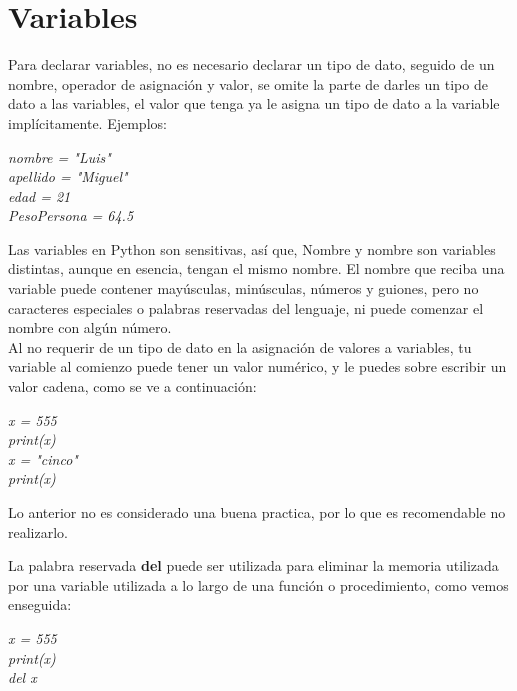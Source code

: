 \section{Variables}
\hspace{0.55cm}Para declarar variables, no es necesario declarar un tipo de dato, seguido de un nombre, operador de asignación y valor, se omite la parte de darles un tipo de dato a las variables, el valor que tenga ya le asigna un tipo de dato a la variable implícitamente. Ejemplos:
\begin{center}
	\textit{
		nombre = "Luis" \\
		apellido = "Miguel" \\
		edad = 21 \\
		PesoPersona = 64.5
	}
\end{center}

Las variables en Python son sensitivas, así que, Nombre y nombre son variables distintas, aunque en esencia, tengan el mismo nombre. El nombre que reciba una variable puede contener mayúsculas, minúsculas, números y guiones, pero no caracteres especiales o palabras reservadas del lenguaje, ni puede comenzar el nombre con algún número.\\

Al no requerir de un tipo de dato en la asignación de valores a variables, tu variable al comienzo puede tener un valor numérico, y le puedes sobre escribir un valor cadena, como se ve a continuación:
\begin{center}
	\textit{
		x = 555 \\
		print(x) \\
		x = "cinco" \\
		print(x)
	}
\end{center}

Lo anterior no es considerado una buena practica, por lo que es recomendable no realizarlo.

La palabra reservada \textbf{del} puede ser utilizada para eliminar la memoria utilizada por una variable utilizada a lo largo de una función o procedimiento, como vemos enseguida:
\begin{center}
	\textit{
		x = 555 \\
		print(x) \\
		del x
	}
\end{center}

